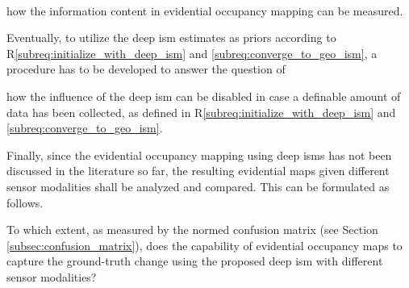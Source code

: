 \\
\begin{requ} \label{requ:how_to_meas_info}
	how the information content in evidential occupancy mapping can be measured.
\end{requ}
Eventually, to utilize the deep \gls{ism} estimates as priors according to R\ref{subreq:initialize_with_deep_ism} and \ref{subreq:converge_to_geo_ism}, a procedure has to be developed to answer the question of
\\
\begin{requ} \label{requ:disable_deep_ism_influence}
	how the influence of the deep \gls{ism} can be disabled in case a definable amount of data has been collected, as defined in R\ref{subreq:initialize_with_deep_ism} and \ref{subreq:converge_to_geo_ism}.
\end{requ}
Finally, since the evidential occupancy mapping using deep \gls{ism}s has not been discussed in the literature so far, the resulting evidential maps given different sensor modalities shall be analyzed and compared. This can be formulated as follows.
\\
\begin{requ} \label{requ:comp_deep_occ_maps}
	To which extent, as measured by the normed confusion matrix (see Section \ref{subsec:confusion_matrix}), does the capability of evidential occupancy maps to capture the ground-truth change using the proposed deep \gls{ism} with different sensor modalities?
\end{requ}
%
